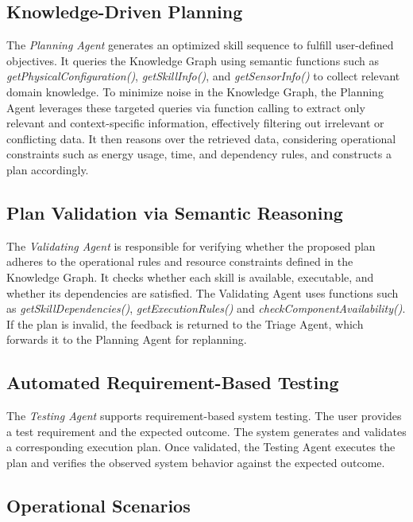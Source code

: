 \documentclass[conference]{IEEEtran}
\begin{document}
\subsection{Knowledge-Driven Planning}

The \textit{Planning Agent} generates an optimized skill sequence to fulfill user-defined objectives. It queries the Knowledge Graph using semantic functions such as \textit{getPhysicalConfiguration()}, \textit{getSkillInfo()}, and \textit{getSensorInfo()} to collect relevant domain knowledge. To minimize noise in the Knowledge Graph, the Planning Agent leverages these targeted queries via function calling to extract only relevant and context-specific information, effectively filtering out irrelevant or conflicting data. It then reasons over the retrieved data, considering operational constraints such as energy usage, time, and dependency rules, and constructs a plan accordingly.


\subsection{Plan Validation via Semantic Reasoning}

The \textit{Validating Agent} is responsible for verifying whether the proposed plan adheres to the operational rules and resource constraints defined in the Knowledge Graph. It checks whether each skill is available, executable, and whether its dependencies are satisfied. The Validating Agent uses functions such as \textit{getSkillDependencies()},  \textit{ getExecutionRules()} and \textit{checkComponentAvailability()}. If the plan is invalid, the feedback is returned to the Triage Agent, which forwards it to the Planning Agent for replanning.

\subsection{Automated Requirement-Based Testing}

The \textit{Testing Agent} supports requirement-based system testing. The user provides a test requirement and the expected outcome. The system generates and validates a corresponding execution plan. Once validated, the Testing Agent executes the plan and verifies the observed system behavior against the expected outcome.

\subsection{Operational Scenarios}
\end{document}
